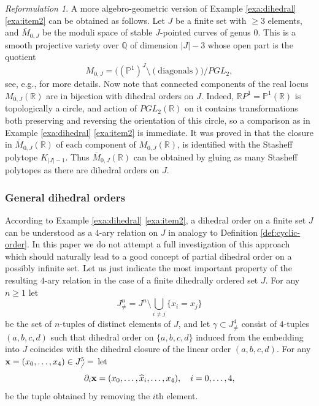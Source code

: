 \documentclass[english,11pt,leqno]{article}
\def\PP{\mathbb{P}}
\def\RR{\mathbb{R}}
\def\QQ{\mathbb{Q}}
\theoremstyle{definition}
\theoremstyle{remark}
\newtheorem{refo}[thm]{Reformulation}
\numberwithin{equation}{section}
\begin{document}
\begin{refo}  A more algebro-geometric version of Example \ref{exa:dihedral} \ref{exa:item2} can be obtained
	as follows. Let  $J$ be a finite set with $\geq 3$ elements, and $\overline M_{0,J}$ be the
	moduli space of stable $J$-pointed curves of genus 0. This is a smooth projective  variety
	over $\QQ$ of dimension $|J|-3$ whose open part is the quotient
	\[
	M_{0,J} = \bigl( (\PP^1)^J \setminus (\text{diagonals} )\bigr) \bigl/ PGL_2,
	\]
	see, e.g., \cite{kapranov-veronese} for more details.  Now note that connected components of the
	real locus $M_{0,J}(\RR)$ are in bijection with dihedral orders on $J$. Indeed, $\RR P^1=
	\PP^1(\RR)$ is topologically a circle, and action of $PGL_2(\RR)$ on it contains transformations
	both preserving and reversing the orientation of this circle, so a comparison as in 
	Example \ref{exa:dihedral} \eqref{exa:item2} is immediate. 
	It was proved in \cite{kapranov-permuto} that the closure in $\overline M_{0,J}(\RR)$ of each component of
	$M_{0,J}(\RR)$, is identified with the Stasheff polytope $K_{|J|-1}$. Thus 
	$\overline M_{0,J}(\RR)$ can be obtained by gluing as many Stasheff polytopes
	as there are dihedral orders on $J$. 
\end{refo}
 
\subsubsection{General dihedral orders}
  
According to Example \ref{exa:dihedral} \eqref{exa:item2}, a dihedral order on a finite
set $J$ can be understood as a $4$-ary relation on $J$ in analogy to Definition
\ref{def:cyclic-order}. In this paper we do not attempt a full investigation of this
approach which should naturally lead to a good concept of partial dihedral order on a
possibly infinite set.  
Let us just indicate the most important property of the resulting $4$-ary relation in the case
of a finite dihedrally ordered set $J$. For any $n\geq 1$ let
\[
	J^n_\neq = J^n \setminus \bigcup_{i\neq j} \{x_i=x_j\}
\]
be the set of $n$-tuples of distinct elements of $J$, and let $\gamma \subset J^4_\neq$
consist of $4$-tuples $(a,b,c,d)$ such that dihedral order on $\{a,b,c,d\}$ induced from the
embedding into $J$ coincides with the dihedral closure of the linear order $(a,b,c,d)$.  
For any ${\bf x}= (x_0, \dots , x_4)\in J^5_\neq$ let
\[
	\partial_i {\bf x} = (x_0, \dots, \widehat x_i, \dots, x_4), \quad i=0, \dots, 4, 
\]
be the tuple obtained by removing the $i$th element. 
 
\end{document}
